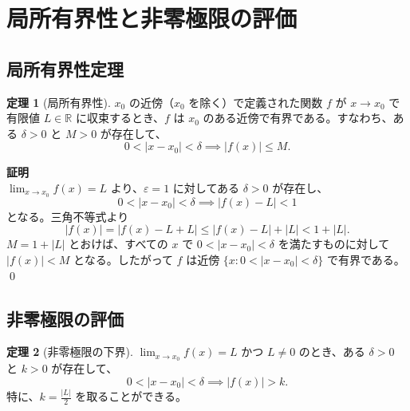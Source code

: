 \documentclass[11pt,a4paper]{jsarticle}
\theoremstyle{definition}
\newtheorem{theorem}{定理}[section]
\newcommand{\R}{\mathbb{R}}
\newcommand{\eps}{\varepsilon}
\begin{document}
\newpage

\section{局所有界性と非零極限の評価}\label{sec:boundedness}

\subsection{局所有界性定理}

\begin{theorembox}[定理：局所有界性]
\begin{theorem}[局所有界性]\label{thm:bounded}
$x_0$ の近傍（$x_0$ を除く）で定義された関数 $f$ が $x \to x_0$ で有限値 $L \in \R$ に収束するとき、$f$ は $x_0$ のある近傍で有界である。すなわち、ある $\delta > 0$ と $M > 0$ が存在して、
\[
0 < |x - x_0| < \delta \implies |f(x)| \leq M.
\]
\end{theorem}
\end{theorembox}

\begin{proofbox}
\textbf{証明}\ \\
\noindent
$\lim_{x \to x_0} f(x) = L$ より、$\eps = 1$ に対してある $\delta > 0$ が存在し、
\[
0 < |x - x_0| < \delta \implies |f(x) - L| < 1
\]
となる。三角不等式より
\[
|f(x)| = |f(x) - L + L| \leq |f(x) - L| + |L| < 1 + |L|.
\]
$M = 1 + |L|$ とおけば、すべての $x$ で $0 < |x - x_0| < \delta$ を満たすものに対して $|f(x)| < M$ となる。したがって $f$ は近傍 $\{x : 0 < |x - x_0| < \delta\}$ で有界である。 \qed
\end{proofbox}

\subsection{非零極限の評価}

\begin{theorembox}[定理：非零極限の下界評価]
\begin{theorem}[非零極限の下界]\label{thm:nonzero}
$\lim_{x \to x_0} f(x) = L$ かつ $L \neq 0$ のとき、ある $\delta > 0$ と $k > 0$ が存在して、
\[
0 < |x - x_0| < \delta \implies |f(x)| > k.
\]
特に、$k = \frac{|L|}{2}$ を取ることができる。
\end{theorem}
\end{theorembox}
\end{document}
